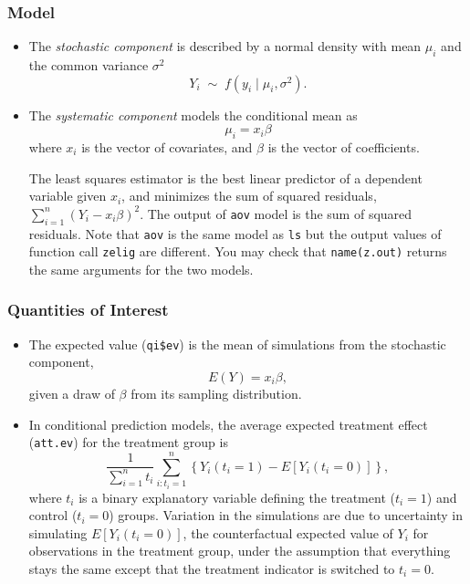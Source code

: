 \subsubsection{Model}
\begin{itemize}
\item The \emph{stochastic component} is described by a normal density
  with mean $\mu_i$ and the common variance $\sigma^2$
  \begin{equation*}
    Y_i \; \sim \; f(y_i \mid \mu_i, \sigma^2).
  \end{equation*}
\item The \emph{systematic component} models the conditional mean as
  \begin{equation*}
     \mu_i =  x_i \beta
  \end{equation*} 
  where $x_i$ is the vector of covariates, and $\beta$ is the vector
  of coefficients.
  
  The least squares estimator is the best linear predictor of a
  dependent variable given $x_i$, and minimizes the sum of squared
  residuals, $\sum_{i=1}^n (Y_i-x_i \beta)^2$. The output of {\tt aov}
  model is the sum  of squared residuals. Note that {\tt aov} is the
  same model as {\tt ls} but the output values of function call   
  {\tt zelig} are different. You may check that {\tt name(z.out)}
  returns the same arguments for the two models.    
\end{itemize}

\subsubsection{Quantities of Interest} 
\begin{itemize}
\item The expected value ({\tt qi\$ev}) is the mean of simulations
  from the stochastic component,  
\begin{equation*}
E(Y) = x_i \beta,\end{equation*}
given a draw of $\beta$ from its sampling distribution.  

\item In conditional prediction models, the average expected treatment
  effect ({\tt att.ev}) for the treatment group is 
    \begin{equation*} \frac{1}{\sum_{i=1}^n t_i}\sum_{i:t_i=1}^n \left\{ Y_i(t_i=1) -
      E[Y_i(t_i=0)] \right\},
    \end{equation*} 
    where $t_i$ is a binary explanatory variable defining the treatment
    ($t_i=1$) and control ($t_i=0$) groups.  Variation in the
    simulations are due to uncertainty in simulating $E[Y_i(t_i=0)]$,
    the counterfactual expected value of $Y_i$ for observations in the
    treatment group, under the assumption that everything stays the
    same except that the treatment indicator is switched to $t_i=0$.

\end{itemize}

